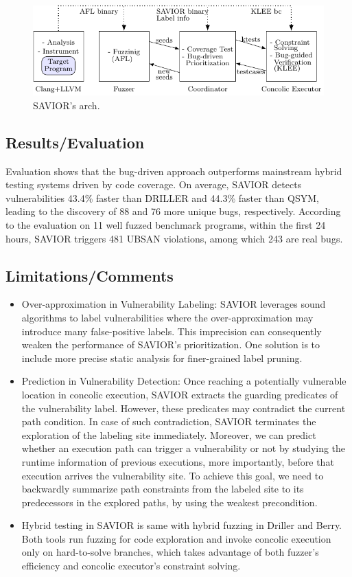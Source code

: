 \begin{figure}[h]
    \centering
    \includegraphics[width=\linewidth]{fig-savior} 
    \caption{SAVIOR's arch.}	
    \label{fig:savior}
\end{figure}


\subsection{Results/Evaluation %
}
Evaluation shows that the bug-driven approach outperforms mainstream hybrid testing systems driven by code coverage. On average, SAVIOR detects vulnerabilities 43.4\% faster than DRILLER and 44.3\% faster than QSYM, leading to the discovery of 88 and 76 more unique bugs, respectively. According to the {evaluation on 11 well fuzzed benchmark programs, within the first 24 hours, SAVIOR triggers 481 UBSAN violations, among which 243 are real bugs.} 
\subsection{Limitations/Comments}
\begin{itemize}
    \item Over-approximation in Vulnerability Labeling: SAVIOR leverages sound algorithms to label vulnerabilities where the over-approximation may introduce many false-positive labels. This imprecision can consequently weaken the performance of SAVIOR's prioritization.  One solution is to include more precise static analysis for finer-grained label pruning.
    \item Prediction in Vulnerability Detection: Once reaching a potentially vulnerable location in concolic execution, SAVIOR extracts the guarding predicates of the vulnerability label. However, these predicates may contradict the current path condition. In case of such contradiction, SAVIOR terminates the exploration of the labeling site immediately.  Moreover, we can predict whether an execution path can trigger a vulnerability or not by studying the runtime information of previous executions, more importantly, before that execution arrives the vulnerability site. To achieve this goal, we need to backwardly summarize path constraints from the labeled site to its predecessors in the explored paths, by using the weakest precondition.
    \item Hybrid testing in SAVIOR is same with hybrid fuzzing in Driller and Berry. Both tools run fuzzing for code exploration and invoke concolic execution only on hard-to-solve branches, which takes advantage of both fuzzer's efficiency and concolic executor's constraint solving.
\end{itemize}
\newpage

